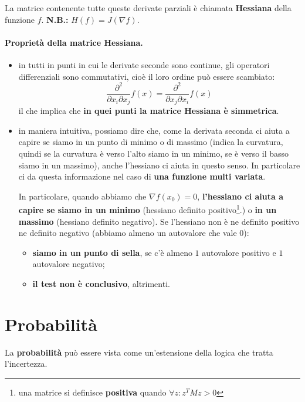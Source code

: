 La matrice contenente tutte queste derivate parziali è chiamata \textbf{Hessiana} della funzione $f$.
\newline
\textbf{N.B.: }$H(f)=J(\nabla f)$.
\newpage

\paragraph{Proprietà della matrice Hessiana.}
\begin{itemize}
    \item in tutti in punti in cui le derivate seconde sono continue, gli operatori differenziali sono commutativi, cioè il loro ordine può essere scambiato:
        \begin{equation}
            \frac{\partial^2}{\partial x_i \partial x_j}f(x)=\frac{\partial^2}{\partial x_j \partial x_i}f(x)
        \end{equation}
        il che implica che \textbf{in quei punti la matrice Hessiana è simmetrica}.
    \item in maniera intuitiva, possiamo dire che, come la derivata seconda ci aiuta a capire se siamo in un punto di minimo o di massimo (indica la curvatura, quindi se la curvatura è verso l'alto siamo in un minimo, se è verso il basso siamo in un massimo), anche l'hessiano ci aiuta in questo senso. In particolare ci da questa informazione nel caso di \textbf{una funzione multi variata}. 


    In particolare, quando abbiamo che $\nabla f(x_0)=0$, \textbf{l'hessiano ci aiuta a capire se siamo in un minimo} (hessiano definito positivo\footnote{una matrice si definisce \textbf{positiva} quando $\forall z:z^TMz>0$}.) o \textbf{in un massimo} (hessiano definito negativo). Se l'hessiano non è ne definito positivo ne definito negativo (abbiamo almeno un autovalore che vale $0$):
    \begin{itemize}
        \item \textbf{siamo in un punto di sella}, se c'è almeno $1$ autovalore positivo e $1$ autovalore negativo;
        \item \textbf{il test non è conclusivo}, altrimenti.
    \end{itemize}
\end{itemize}
\newpage
\section{Probabilità}
La \textbf{probabilità} può essere vista come un'estensione della logica che tratta l'incertezza.


